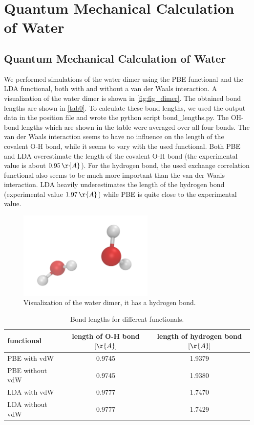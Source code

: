 \documentclass[a4paper,10pt,bibtotoc]{scrartcl}
\begin{document}
\section{Quantum Mechanical Calculation of Water}
\subsection{Quantum Mechanical Calculation of Water}
We performed simulations of the water dimer using the PBE functional and the LDA functional, both with and without a van der Waals interaction. 
A visualization of the water dimer is shown in \autoref{fig:fig_dimer}.
The obtained bond lengths are shown in \autoref{tab0}.
To calculate these bond lengths, we used the output data in the position file and wrote the python script bond\_lengths.py. 
The OH-bond lengths which are shown in the table were averaged over all four bonds.
The van der Waals interaction seems to have no influence on the length of the covalent O-H bond, while it seems to vary with the used functional. Both PBE and LDA overestimate the length of the covalent O-H bond (the experimental value is about $0.95\,\r{A}$). 
For the hydrogen bond, the used exchange correlation functional also seems to be much more important than the van der Waals interaction. 
LDA heavily underestimates the length of the hydrogen bond (experimental value $1.97\,\r{A}$) while PBE is quite close to the experimental value.

\begin{figure}[h]
\centering
 \includegraphics[width=0.6\textwidth]{dimer.png}
 \caption{Visualization of the water dimer, it has a hydrogen bond.}
 \label{fig:fig_dimer}
\end{figure}

\begin{table}[h]
\centering
\caption{Bond lengths for different functionals.}
\begin{tabular}{@{}lcc@{}}
\toprule
functional & length of O-H bond $\left[\r{A}\right]$ & length of hydrogen bond $\left[\r{A}\right]$ \\ \midrule
PBE with vdW       & 0.9745 & 1.9379                 \\
PBE without vdW       & 0.9745
 & 1.9380    \\
LDA with vdW       & 0.9777 & 1.7470              \\ 
LDA without vdW & 0.9777& 1.7429\\\bottomrule
\end{tabular}
\label{tab0}
\end{table}
\end{document}
